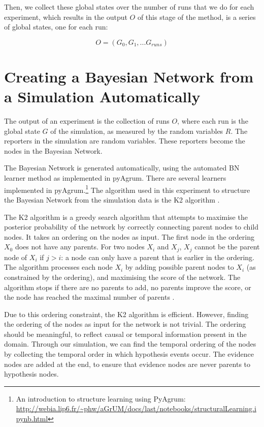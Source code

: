 Then, we collect these global states over the number of runs that we do for each experiment, which results in the output $O$ of this stage of the method, is a series of global states, one for each run:

\[ O = (G_0, G_1, ... G_{runs})\]



\section{Creating a Bayesian Network from a Simulation Automatically}

The output of an experiment is the collection of runs $O$, where each run is the global state $G$ of the simulation, as measured by the random variables $R$. The reporters in the simulation are random variables. These reporters become the nodes in the Bayesian Network.

The Bayesian Network is generated automatically, using the automated BN learner method as implemented in pyAgrum. There are several learners implemented in pyAgrum.\footnote{An introduction to structure learning using PyAgrum: \url{http://webia.lip6.fr/~phw/aGrUM/docs/last/notebooks/structuralLearning.ipynb.html}} The algorithm used in this experiment to structure the Bayesian Network from the simulation data is the K2 algorithm \citep{Cooper1992}. 

The K2 algorithm is a greedy search algorithm that attempts to maximise the posterior probability of the network by correctly connecting parent nodes to child nodes. It takes an ordering on the nodes as input. The first node in the ordering $X_0$ does not have any parents. For two nodes $X_i$ and $X_j$, $X_j$ cannot be the parent node of $X_i$ if $j > i$: a node can only have a parent that is earlier in the ordering. The algorithm processes each node $X_i$ by adding possible parent nodes to $X_i$ (as constrained by the ordering), and maximising the score of the network. The algorithm stops if there are no parents to add, no parents improve the score, or the node has reached the maximal number of parents \citep{Chen2008}.

Due to this ordering constraint, the K2 algorithm is efficient. However, finding the ordering of the nodes as input for the network is not trivial. The ordering should be meaningful, to reflect causal or temporal information present in the domain. Through our simulation, we can find the temporal ordering of the nodes by collecting the temporal order in which hypothesis events occur. The evidence nodes are added at the end, to ensure that evidence nodes are never parents to hypothesis nodes. 

